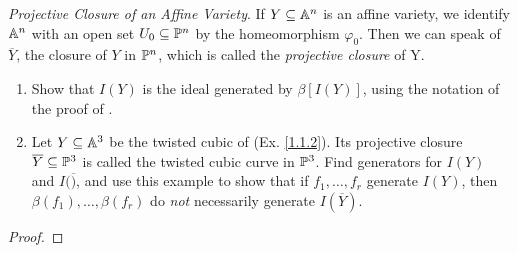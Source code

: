 \label{1.2.9}

\textit{Projective Closure of an Affine Variety}. If $Y \subseteq \A^n$ is an affine variety, we identify $\A^n$ with an open set $U_0 \subseteq \P^n$ by the homeomorphism $\varphi_0$. Then we can speak of $\overline{Y}$, the closure of $Y$ in $\P^n$, which is called the \textit{projective closure} of Y.

\begin{enumerate}[label = (\alph*)]
    \item Show that $I(Y)$ is the ideal generated by $\beta[I(Y)]$, using the notation of the proof of \cite[2.2]{hartshorne}.
    
    \item Let $Y \subseteq \A^3$ be the twisted cubic of (Ex. \ref{1.1.2}). Its projective closure $\overline{Y} \subseteq \P^3$ is called the twisted cubic curve in $\P^3$. Find generators for $I(Y)$ and $I(\overline)$, and use this example to show that if $f_1, \dots, f_r$ generate $I(Y)$, then $\beta(f_1), \dots, \beta(f_r)$ do \textit{not} necessarily generate $I(\overline{Y})$.
\end{enumerate}

\begin{proof}
    
\end{proof}